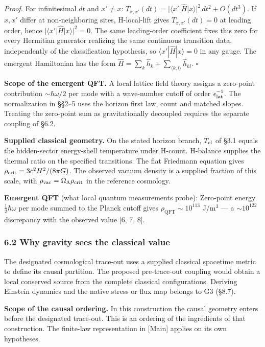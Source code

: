 \documentclass[
]{article}
\begin{document}
\emph{Proof.} For infinitesimal \(dt\) and \(x' \neq x\):
\(T_{x,x'}(dt) = |\langle x'|\hat{H}|x\rangle|^2\,dt^2 + O(dt^3)\). If
\(x, x'\) differ at non-neighboring sites, H-local-lift gives
\(T_{x,x'}(dt) = 0\) at leading order, hence
\(|\langle x'|\hat{H}|x\rangle|^2 = 0\). The same leading-order
coefficient fixes this zero for every Hermitian generator realizing the
same continuous transition data, independently of the classification
hypothesis, so \(\langle x'|\hat{H}|x\rangle = 0\) in any gauge. The
emergent Hamiltonian has the form
\(\hat{H} = \sum_k \hat{h}_k + \sum_{\langle k,l\rangle} \hat{h}_{kl}\).
\(\square\)

\textbf{Scope of the emergent QFT.} A local lattice field theory assigns
a zero-point contribution \(\sim\hbar\omega/2\) per mode with a
wave-number cutoff of order \(\epsilon_{\rm lat}^{-1}\). The
normalization in §§2--5 uses the horizon first law, count and matched
slopes. Treating the zero-point sum as gravitationally decoupled
requires the separate coupling of §6.2.

\textbf{Supplied classical geometry.} On the stated horizon branch,
\(T_{\rm cl}\) of §3.1 equals the hidden-sector energy-shell temperature
under H-count. H-balance supplies the thermal ratio on the specified
transitions. The flat Friedmann equation gives
\(\rho_{\rm crit}=3c^2H^2/(8\pi G)\). The observed vacuum density is a
supplied fraction of this scale, with
\(\rho_{\rm vac}=\Omega_\Lambda\rho_{\rm crit}\) in the reference
cosmology.

\textbf{Emergent QFT} (what local quantum measurements probe):
Zero-point energy \(\frac{1}{2}\hbar\omega\) per mode summed to the
Planck cutoff gives \(\rho_{\text{QFT}} \sim 10^{113}\) J/m\(^3\) --- a
\(\sim 10^{122}\) discrepancy with the observed value {[}6, 7, 8{]}.

\hypertarget{why-gravity-sees-the-classical-value}{%
\subsubsection{6.2 Why gravity sees the classical
value}\label{why-gravity-sees-the-classical-value}}

The designated cosmological trace-out uses a supplied classical
spacetime metric to define its causal partition. The proposed
pre-trace-out coupling would obtain a local conserved source from the
complete classical configurations. Deriving Einstein dynamics and the
native stress or flux map belongs to G3 (§8.7).

\textbf{Scope of the causal ordering.} In this construction the causal
geometry enters before the designated trace-out. This is an ordering of
the ingredients of that construction. The finite-law representation in
{[}Main{]} applies on its own hypotheses.
\end{document}
